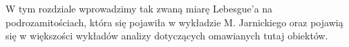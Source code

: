 W tym rozdziale wprowadzimy tak zwaną miarę Lebesgue'a na podrozamitościach, która się pojawiła w wykładzie M. Jarnickiego \citep{Jarnicki}
oraz pojawią się w większości wykładów analizy dotyczących omawianych tutaj obiektów.